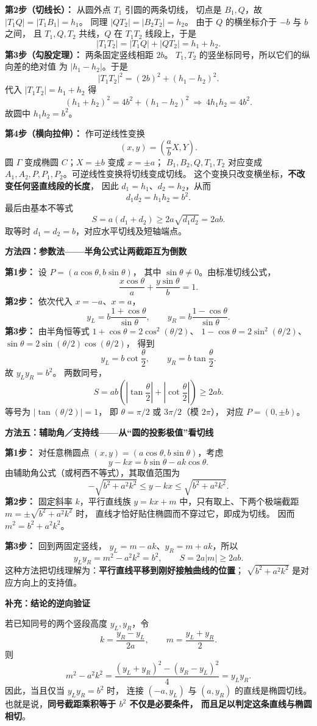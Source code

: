 \begin{proofbox}
\textbf{第2步（切线长）：} 从圆外点 $T_1$ 引圆的两条切线，
切点是 $B_1,Q$，故 $|T_1Q|=|T_1B_1|=h_1$。
同理 $|QT_2|=|B_2T_2|=h_2$。
由于 $Q$ 的横坐标介于 $-b$ 与 $b$ 之间，
且 $T_1,Q,T_2$ 共线，$Q$ 在 $T_1T_2$ 线段上，于是
\[
|T_1T_2|=|T_1Q|+|QT_2|=h_1+h_2.
\]
\textbf{第3步（勾股定理）：} 两条固定竖线相距 $2b$。
$T_1,T_2$ 的竖坐标同号，所以它们的纵向差的绝对值
为 $|h_1-h_2|$。于是
\[
|T_1T_2|^2=(2b)^2+(h_1-h_2)^2.
\]
代入 $|T_1T_2|=h_1+h_2$ 得
\[
(h_1+h_2)^2=4b^2+(h_1-h_2)^2
\ \Longrightarrow\ 4h_1h_2=4b^2.
\]
故圆中 $\boxed{h_1h_2=b^2}$。

\textbf{第4步（横向拉伸）：} 作可逆线性变换
\[
(x,y)=\left(\frac abX,Y\right).
\]
圆 $\Gamma$ 变成椭圆 $C$；$X=\pm b$ 变成 $x=\pm a$；
$B_1,B_2,Q,T_1,T_2$ 对应变成
$A_1,A_2,P,P_1,P_2$。可逆线性变换将切线变成切线。
这个变换只改变横坐标，\textbf{不改变任何竖直线段的长度}，
因此 $d_1=h_1$、$d_2=h_2$，从而
\[
\boxed{d_1d_2=h_1h_2=b^2.}
\]
最后由基本不等式
\[
S=a(d_1+d_2)\ge2a\sqrt{d_1d_2}=2ab.
\]
取等时 $d_1=d_2=b$，对应水平切线及短轴端点。

\medskip
\textbf{方法四：参数法——半角公式让两截距互为倒数}

\textbf{第1步：} 设 $P=(a\cos\theta,b\sin\theta)$，
其中 $\sin\theta\ne0$。由标准切线公式，
\[
\frac{x\cos\theta}{a}+\frac{y\sin\theta}{b}=1.
\]
\textbf{第2步：} 依次代入 $x=-a$、$x=a$，
\[
y_L=b\frac{1+\cos\theta}{\sin\theta},\qquad
 y_R=b\frac{1-\cos\theta}{\sin\theta}.
\]
\textbf{第3步：} 由半角恒等式
$1+\cos\theta=2\cos^2(\theta/2)$、
$1-\cos\theta=2\sin^2(\theta/2)$、
$\sin\theta=2\sin(\theta/2)\cos(\theta/2)$，
得到
\[
y_L=b\cot\frac\theta2,\qquad
 y_R=b\tan\frac\theta2.
\]
故 $\boxed{y_Ly_R=b^2}$。
两数同号，
\[
S=ab\left(\left|\tan\frac\theta2\right|
+\left|\cot\frac\theta2\right|\right)\ge2ab.
\]
等号为 $|\tan(\theta/2)|=1$，
即 $\theta=\pi/2$ 或 $3\pi/2$（模 $2\pi$），
对应 $P=(0,\pm b)$。

\medskip
\textbf{方法五：辅助角／支持线——从“圆的投影极值”看切线}

\textbf{第1步：} 对任意椭圆点
$(x,y)=(a\cos\theta,b\sin\theta)$，考虑
\[
y-kx=b\sin\theta-ak\cos\theta.
\]
由辅助角公式（或柯西不等式），其取值范围为
\[
-\sqrt{b^2+a^2k^2}\le y-kx
\le\sqrt{b^2+a^2k^2}.
\]
\textbf{第2步：} 固定斜率 $k$，平行直线族
$y=kx+m$ 中，只有取上、下两个极端截距
$m=\pm\sqrt{b^2+a^2k^2}$ 时，
直线才恰好贴住椭圆而不穿过它，即成为切线。
因而 $m^2=b^2+a^2k^2$。

\textbf{第3步：} 回到两固定竖线，
$y_L=m-ak$、$y_R=m+ak$，所以
\[
y_Ly_R=m^2-a^2k^2=b^2,\qquad
S=2a|m|\ge2ab.
\]
这种方法把切线理解为：\textbf{平行直线平移到刚好接触曲线的位置}；
$\sqrt{b^2+a^2k^2}$ 是对应方向上的支持值。

\medskip
\textbf{补充：结论的逆向验证}

若已知同号的两个竖段高度 $y_L,y_R$，令
\[
k=\frac{y_R-y_L}{2a},\qquad m=\frac{y_L+y_R}{2}.
\]
则
\[
m^2-a^2k^2
=\frac{(y_L+y_R)^2-(y_R-y_L)^2}{4}
=y_Ly_R.
\]
因此，当且仅当 $y_Ly_R=b^2$ 时，
连接 $(-a,y_L)$ 与 $(a,y_R)$ 的直线是椭圆切线。
也就是说，\textbf{同号截距乘积等于 $b^2$ 不仅是必要条件，
而且足以判定这条直线与椭圆相切}。
\end{proofbox}
